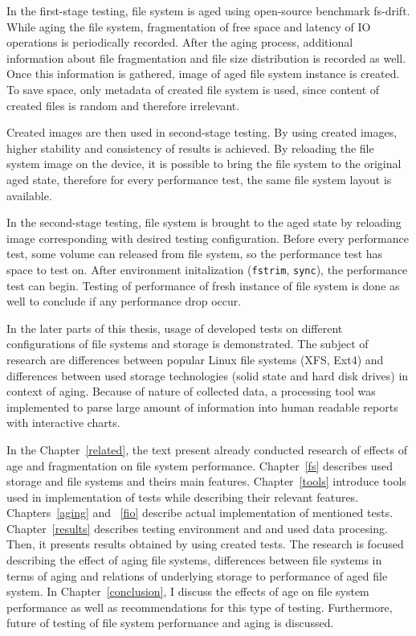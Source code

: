 \documentclass[
  color, %
  table, %
  lof,   %
  lot,   %
]{fithesis3}
\begin{document}
In the first-stage testing, file system is aged using open-source benchmark fs-drift. While aging the file system, fragmentation of free space and latency of IO operations is periodically recorded. After the aging process, additional information about file fragmentation and file size distribution is recorded as well. Once this information is gathered, image of aged file system instance is created. To save space, only metadata of created file system is used, since content of created files is random and therefore irrelevant.

Created images are then used in second-stage testing. By using created images, higher stability and consistency of results is achieved. By reloading the file system image on the device, it is possible to bring the file system to the original aged state, therefore for every performance test, the same file system layout is available.

In the second-stage testing, file system is brought to the aged state by reloading image corresponding with desired testing configuration. Before every performance test, some volume can released from file system, so the performance test has space to test on. After environment initalization (\texttt{fstrim}, \texttt{sync}), the performance test can begin. Testing of performance of fresh instance of file system is done as well to conclude if any performance drop occur.

In the later parts of this thesis, usage of developed tests on different configurations of file systems and storage is demonstrated. The subject of research are differences between popular Linux file systems (XFS, Ext4) and differences between used storage technologies (solid state and hard disk drives) in context of aging. Because of nature of collected data, a processing tool was implemented to parse large amount of information into human readable reports with interactive charts.

In the Chapter~\ref{related}, the text present already conducted research of effects of age and fragmentation on file system performance. Chapter~\ref{fs} describes used storage and file systems and theirs main features. Chapter~\ref{tools} introduce tools used in implementation of tests while describing their relevant features. Chapters~\ref{aging} and ~\ref{fio} describe actual implementation of mentioned tests. Chapter~\ref{results} describes testing environment and and used data procesing. Then, it presents results obtained by using created tests. The research is focused describing the effect of aging file systems, differences between file systems in terms of aging and relations of underlying storage to performance of aged file system. In Chapter~\ref{conclusion}, I discuss the effects of age on file system performance as well as recommendations for this type of testing. Furthermore, future of testing of file system performance and aging is discussed.
\end{document}
